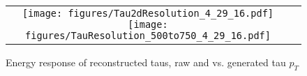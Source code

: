 \begin{figure}[tbh!]
  \centering
  \begin{tabular}{cc}
  \texttt{[image: figures/Tau2dResolution\_4\_29\_16.pdf]}
  \texttt{[image: figures/TauResolution\_500to750\_4\_29\_16.pdf]}
  \end{tabular}
  \caption{Energy response of reconstructed taus, raw and vs. generated tau $p_{T}$}
  \label{fig:Tau2dResolution}
\end{figure}


